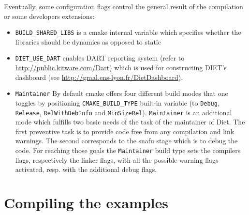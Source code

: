Eventually, some configuration flags control the general result of the
compilation or some developers extensions:
\begin{itemize}
\item
  \verb+BUILD_SHARED_LIBS+ is a cmake internal variable which specifies
  whether the libraries should be dynamics as opposed to static

\item
  \verb+DIET_USE_DART+ enables DART reporting system (refer to 
  \url{http://public.kitware.com/Dart}) which is used for constructing
  DIET's dashboard (see \url{http://graal.ens-lyon.fr/DietDashboard}).

\item
  \verb+Maintainer+ By default cmake offers four different build modes
  that one toggles by positioning \verb+CMAKE_BUILD_TYPE+ built-in
  variable (to \verb+Debug+, \verb+Release+, \verb+RelWithDebInfo+
  and \verb+MinSizeRel+).
  \verb+Maintainer+ is an additional mode which fulfills two basic needs
  of the task of the maintainer of Diet.
  The first preventive task is to provide code free from any compilation
  and link warnings.
  The second corresponds to the snafu stage which is to debug the code.
  For reaching those goals the \verb+Maintainer+ build type sets the
  compilers flags, respectively the linker flags, with all the possible
  warning flags activated, resp. with the additional debug flags.
\end{itemize}

\section{Compiling the examples}

